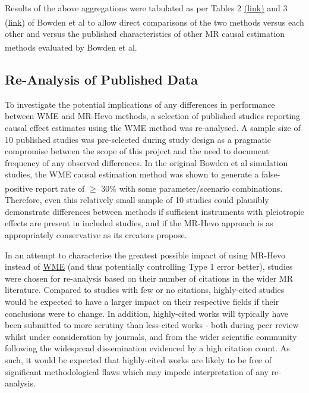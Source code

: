 \documentclass[
]{article}
\begin{document}
Results of the above aggregations were tabulated as per Tables 2 \href{https://pmc.ncbi.nlm.nih.gov/articles/PMC4849733/table/gepi21965-tbl-0002/}{(link)} and 3 \href{https://pmc.ncbi.nlm.nih.gov/articles/PMC4849733/table/gepi21965-tbl-0003/}{(link)} of Bowden et al\textsuperscript{} to allow direct comparisons of the two methods versus each other and versus the published characteristics of other MR causal estimation methods evaluated by Bowden et al\textsuperscript{}.

\subsection{Re-Analysis of Published Data}\label{re-analysis-of-published-data}

To investigate the potential implications of any differences in performance between WME and MR-Hevo methods, a selection of published studies reporting causal effect estimates using the WME method was re-analysed. A sample size of 10 published studies was pre-selected during study design as a pragmatic compromise between the scope of this project and the need to document frequency of any observed differences. In the original Bowden et al simulation studies, the WME causal estimation method was shown to generate a false-positive report rate of \(\ge\) 30\% with some parameter/scenario combinations\textsuperscript{}. Therefore, even this relatively small sample of 10 studies could plausibly demonstrate differences between methods if sufficient instruments with pleiotropic effects are present in included studies, and if the MR-Hevo approach is as appropriately conservative as its creators propose.

In an attempt to characterise the greatest possible impact of using MR-Hevo instead of \hyperref[acronyms_WME]{WME} (and thus potentially controlling Type 1 error better), studies were chosen for re-analysis based on their number of citations in the wider MR literature. Compared to studies with few or no citations, highly-cited studies would be expected to have a larger impact on their respective fields if their conclusions were to change. In addition, highly-cited works will typically have been submitted to more scrutiny than less-cited works - both during peer review whilst under consideration by journals, and from the wider scientific community following the widespread dissemination evidenced by a high citation count. As such, it would be expected that highly-cited works are likely to be free of significant methodological flaws which may impede interpretation of any re-analysis.
\end{document}
